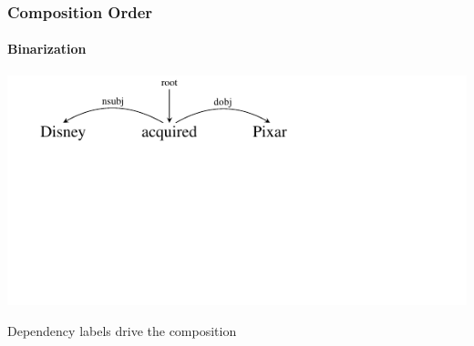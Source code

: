 \documentclass[mathserif,12pt]{beamer}
\begin{document}
\begin{frame}
\frametitle{Composition Order}
\framesubtitle{Binarization}
\begin{center}
\vspace{-5em}
\includegraphics[trim=2em 9.4em 10em 0em,clip=true,scale=1.3]{figures/pixar}

\vspace{2cm}
\begin{block}{}
\centering
Dependency labels drive the composition
\end{block}
\end{center}
\end{frame}
\end{document}
